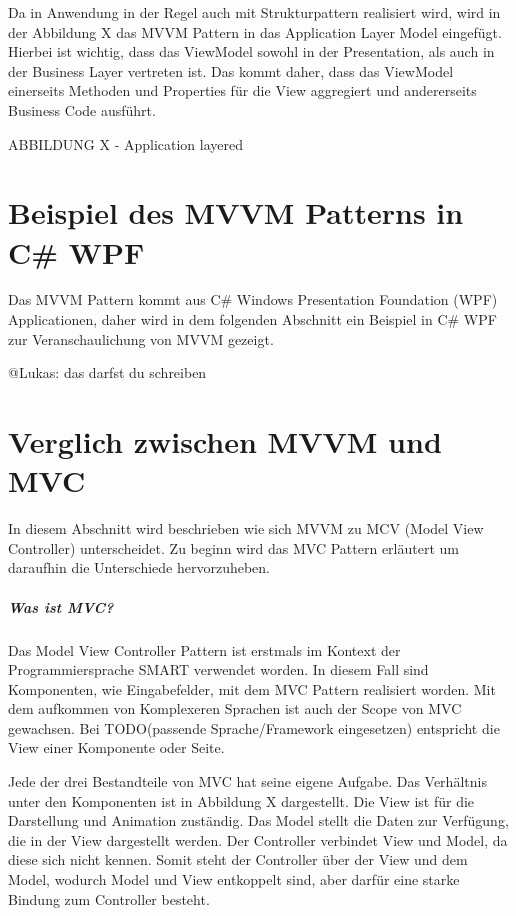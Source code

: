 \documentclass[titlepage=false,12pt]{scrreprt}
\begin{document}
Da in Anwendung in der Regel auch mit Strukturpattern realisiert wird, wird in der Abbildung X
das MVVM Pattern in das Application Layer Model eingefügt. Hierbei ist wichtig, dass das
ViewModel sowohl in der Presentation, als auch in der Business Layer vertreten ist. Das kommt
daher, dass das ViewModel einerseits Methoden und Properties für die View aggregiert und andererseits
Business Code ausführt.  

ABBILDUNG X - Application layered

\chapter{Beispiel des MVVM Patterns in C\# WPF}

Das MVVM Pattern kommt aus C\# Windows Presentation Foundation (WPF) Applicationen, daher
wird in dem folgenden Abschnitt ein Beispiel in C\# WPF zur Veranschaulichung von MVVM gezeigt.


@Lukas: das darfst du schreiben

\chapter{Verglich zwischen MVVM und MVC}

In diesem Abschnitt wird beschrieben wie sich MVVM zu MCV (Model View Controller) unterscheidet. 
Zu beginn wird das MVC Pattern erläutert um daraufhin die Unterschiede hervorzuheben. 

\paragraph{Was ist MVC?}

Das Model View Controller Pattern ist erstmals im Kontext der Programmiersprache SMART verwendet 
worden. In diesem Fall sind Komponenten, wie Eingabefelder, mit dem MVC Pattern realisiert worden.
Mit dem aufkommen von Komplexeren Sprachen ist auch der Scope von MVC gewachsen. Bei TODO(passende Sprache/Framework eingesetzen)
entspricht die View einer Komponente oder Seite.

Jede der drei Bestandteile von MVC hat seine eigene Aufgabe. Das Verhältnis unter den Komponenten
ist in Abbildung X dargestellt. Die View ist für die Darstellung und
Animation zuständig. Das Model stellt die Daten zur Verfügung, die in der View dargestellt werden.
Der Controller verbindet View und Model, da diese sich nicht kennen. Somit steht der Controller 
über der View und dem Model, wodurch Model und View entkoppelt sind, aber darfür eine starke Bindung
zum Controller besteht. 
\end{document}
